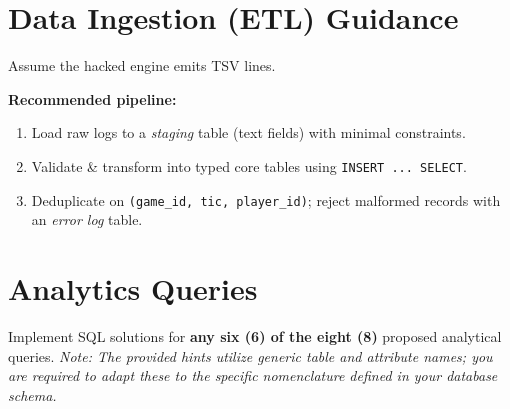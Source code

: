 \documentclass[11pt]{article}
\begin{document}
\section{Data Ingestion (ETL) Guidance}
Assume the hacked engine emits TSV lines.

\noindent \textbf{Recommended pipeline:}
\begin{enumerate}[leftmargin=*]
  \item Load raw logs to a \emph{staging} table (text fields) with minimal constraints.
  \item Validate \& transform into typed core tables using \texttt{INSERT ... SELECT}.
  \item Deduplicate on \texttt{(game\_id, tic, player\_id)}; reject malformed records with an \emph{error log} table.
\end{enumerate}

\section{Analytics Queries} \label{sec:queries}
Implement SQL solutions for \textbf{any six (6) of the eight (8)} proposed analytical queries. \textit{Note: The provided hints utilize generic table and attribute names; you are required to adapt these to the specific nomenclature defined in your database schema.}
\end{document}
